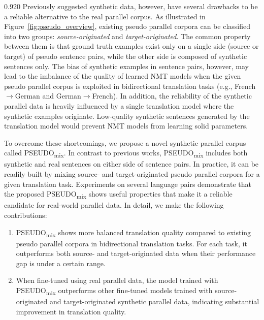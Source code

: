 \documentclass[11pt,letterpaper]{article}
\newcommand{\mylinespacing}{0.920}
\begin{document}
\begin{spacing}{\mylinespacing}
Previously suggested synthetic data, however, have several drawbacks to be a reliable alternative to the real parallel corpus. As illustrated in Figure~\ref{fig:pseudo_overview}, existing pseudo parallel corpora can be classified into two groups: \textit{source-originated} and \textit{target-originated}. The common property between them is that ground truth examples exist only on a single side (source or target) of pseudo sentence pairs, while the other side is composed of synthetic sentences only. The bias of synthetic examples in sentence pairs, however, may lead to the imbalance of the quality of learned NMT models when the given pseudo parallel corpus is exploited in bidirectional translation tasks (e.g., French\(\rightarrow\)German and German\(\rightarrow\)French). In addition, the reliability of the synthetic parallel data is heavily influenced by a single translation model where the synthetic examples originate. Low-quality synthetic sentences generated by the translation model would prevent NMT models from learning solid parameters.

To overcome these shortcomings, we propose a novel synthetic parallel corpus called PSEUDO\textsubscript{mix}. In contrast to previous works, PSEUDO\textsubscript{mix} includes both synthetic and real sentences on either side of sentence pairs. In practice, it can be readily built by mixing source- and target-originated pseudo parallel corpora for a given translation task. Experiments on several language pairs demonstrate that the proposed PSEUDO\textsubscript{mix} shows useful properties that make it a reliable candidate for real-world parallel data. In detail, we make the following contributions:

\begin{enumerate}

\item PSEUDO\textsubscript{mix} shows more balanced translation quality compared to existing pseudo parallel corpora in bidirectional translation tasks. For each task, it outperforms both source- and target-originated data when their performance gap is under a certain range.

\item When fine-tuned using real parallel data, the model trained with PSEUDO\textsubscript{mix} outperforms other fine-tuned models trained with source-originated and target-originated synthetic parallel data, indicating substantial improvement in translation quality.

\end{enumerate}



\end{spacing}
\end{document}
